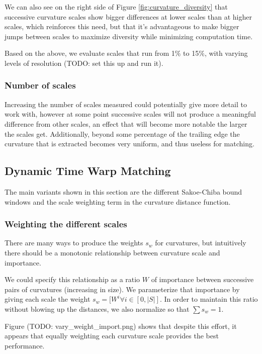 We can also see on the right side of Figure \ref{fig:curvature_diversity} that successive curvature scales show bigger differences at lower scales than at higher scales, which reinforces this need, but that it's advantageous to make bigger jumps between scales to maximize diversity while minimizing computation time.

Based on the above, we evaluate scales that run from 1\% to 15\%, with varying levels of resolution (TODO: set this up and run it).

\subsubsection{Number of scales}

Increasing the number of scales measured could potentially give more detail to work with, however at some point successive scales will not produce a meaningful difference from other scales, an effect that will become more notable the larger the scales get. %
Additionally, beyond some percentage of the trailing edge the curvature that is extracted becomes very uniform, and thus useless for matching. %

\subsection{Dynamic Time Warp Matching}

The main variants shown in this section are the different Sakoe-Chiba bound windows and the scale weighting term in the curvature distance function.

\subsubsection{Weighting the different scales}

There are many ways to produce the weights $s_w$ for curvatures, but intuitively there should be a monotonic relationship between curvature scale and importance.

We could specify this relationship as a ratio $W$ of importance between successive pairs of curvatures (increasing in size).
We parameterize that importance by giving each scale the weight $s_w = [W^i \forall i \in [0,|S|]$.
In order to maintain this ratio without blowing up the distances, we also normalize so that $\sum s_w = 1$.

Figure (TODO: vary\_weight\_import.png) shows that despite this effort, it appears that equally weighting each curvature scale provides the best performance.

